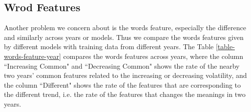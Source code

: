 \documentclass[11pt]{article}
\begin{document}
\subsection{Wrod Features}

Another problem we concern about is the words feature, especially the difference and similarly across years or models. Thus we compare the words features given by different models with training data from different years. The Table \ref{table-words-feature-year} compares the words features across years, where the column ``Increasing Common" and ``Decreasing Common" shows the rate of the nearby two years' common features related to the increasing or decreasing volatility, and the column ``Different" shows the rate of the features that are corresponding to the different trend, i.e. the rate of the features that changes the meanings in two years.
\end{document}
